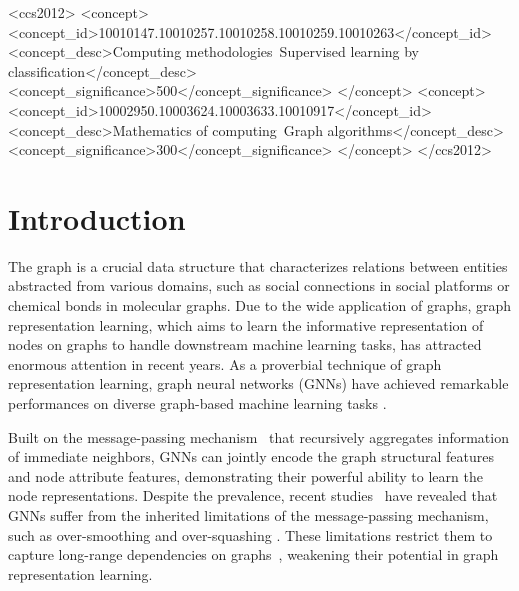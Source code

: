 \documentclass[sigconf, screen]{acmart}
\begin{document}
\begin{CCSXML}
<ccs2012>
<concept>
<concept_id>10010147.10010257.10010258.10010259.10010263</concept_id>
<concept_desc>Computing methodologies~Supervised learning by classification</concept_desc>
<concept_significance>500</concept_significance>
</concept>
<concept>
<concept_id>10002950.10003624.10003633.10010917</concept_id>
<concept_desc>Mathematics of computing~Graph algorithms</concept_desc>
<concept_significance>300</concept_significance>
</concept>
</ccs2012>
\end{CCSXML}







\maketitle

\section{Introduction}
The graph is a crucial data structure that characterizes relations between entities abstracted from various domains, such as social connections in social platforms or chemical bonds in molecular graphs. 
Due to the wide application of graphs, graph representation learning, which aims to learn the informative representation of nodes on graphs to handle downstream machine learning tasks, has attracted enormous attention in recent years.
As a proverbial technique of graph representation learning, graph neural networks (GNNs) have achieved remarkable performances on diverse graph-based machine learning tasks \cite{gcn,gcnii,gin}.

Built on the message-passing mechanism~\cite{mpnn} that recursively aggregates information of immediate neighbors,  GNNs can jointly encode the graph structural features and node attribute features, demonstrating their powerful ability to learn the node representations.
Despite the prevalence, recent studies~\cite{oversmoothing,oversq,gcnii} have revealed that GNNs suffer from the inherited limitations of the message-passing mechanism, such as over-smoothing \cite{oversmoothing} and over-squashing \cite{oversq}. These limitations restrict them to capture long-range dependencies on graphs~\cite{graphtrans}, weakening their potential in graph representation learning.
\end{document}
